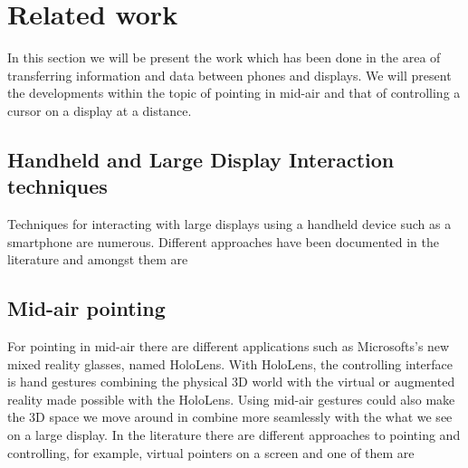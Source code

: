 \section{Related work} \label{sec:relatedwork}
In this section we will be present the work which has been done in the area of transferring information and data between phones and displays.
We will present the developments within the topic of pointing in mid-air and that of controlling a cursor on a display at a distance.

\subsection{Handheld and Large Display Interaction techniques} \label{sec:techniquesForTransfer}
Techniques for interacting with large displays using a handheld device such as a smartphone are numerous.
Different approaches have been documented in the literature and amongst them are 

\subsection{Mid-air pointing} \label{sec:midAirPointing}
For pointing in mid-air there are different applications such as Microsofts's new mixed reality glasses, named HoloLens.
With HoloLens, the controlling interface is hand gestures combining the physical 3D world with the virtual or augmented reality made possible with the HoloLens.
Using mid-air gestures could also make the 3D space we move around in combine more seamlessly with the what we see on a large display.
In the literature there are different approaches to pointing and controlling, for example, virtual pointers on a screen and one of them are 